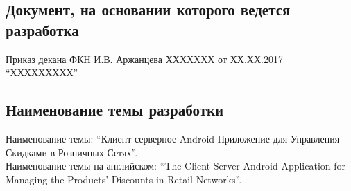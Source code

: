 \subsection{Документ, на основании которого ведется разработка}
Приказ декана ФКН И.В. Аржанцева
\textnumero ХХХХХХХ от ХХ.ХХ.2017 ``ХХХХХХХХХ''

\subsection{Наименование темы разработки}
Наименование темы: ``Клиент-серверное Android-Приложение для Управления Скидками в Розничных Сетях''. \\
Наименование темы на английском: ``The Client-Server Android Application for Managing the Products' Discounts in Retail Networks''. \\
